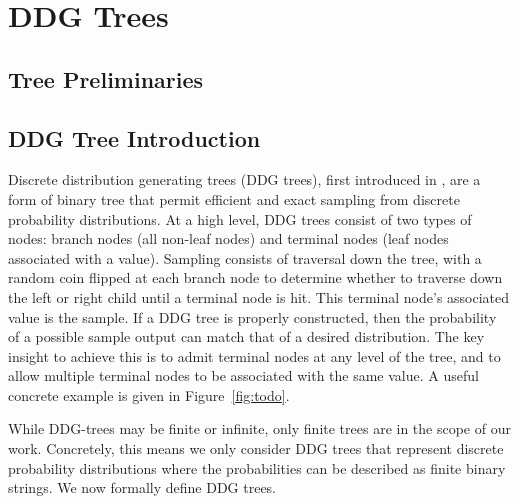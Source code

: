 \section{DDG Trees} \label{sec:ddg-trees}

\subsection{Tree Preliminaries}

\subsection{DDG Tree Introduction}

Discrete distribution generating trees (DDG trees), first introduced in \cite{ALGCPLX:KnuYao76}, are a form of binary tree that permit efficient and exact sampling from discrete probability distributions.
At a high level, DDG trees consist of two types of nodes: branch nodes (all non-leaf nodes) and terminal nodes (leaf nodes associated with a value). 
Sampling consists of traversal down the tree, with a random coin flipped at each branch node to determine whether to traverse down the left or right child until a terminal node is hit.
This terminal node's associated value is the sample.
If a DDG tree is properly constructed, then the probability of a possible sample output can match that of a desired distribution. 
The key insight to achieve this is to admit terminal nodes at any level of the tree, and to allow multiple terminal nodes to be associated with the same value.
A useful concrete example is given in Figure~\ref{fig:todo}.

While DDG-trees may be finite or infinite, only finite trees are in the scope of our work.
Concretely, this means we only consider DDG trees that represent discrete probability distributions where the probabilities can be described as finite binary strings. 
We now formally define DDG trees.